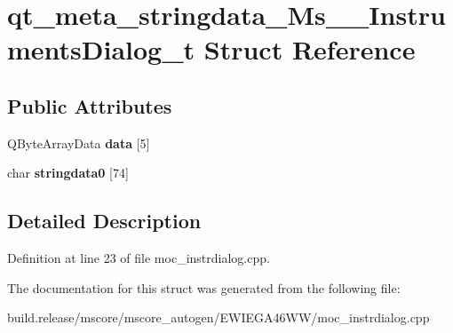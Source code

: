 \hypertarget{structqt__meta__stringdata___ms_____instruments_dialog__t}{}\section{qt\+\_\+meta\+\_\+stringdata\+\_\+\+Ms\+\_\+\+\_\+\+Instruments\+Dialog\+\_\+t Struct Reference}
\label{structqt__meta__stringdata___ms_____instruments_dialog__t}
\subsection*{Public Attributes}
\begin{DoxyCompactItemize}
\item 
\mbox{\label{structqt__meta__stringdata___ms_____instruments_dialog__t_a536ed3f3a4277171deba9ec669fe6dc2}} 
Q\+Byte\+Array\+Data {\bfseries data} \mbox{[}5\mbox{]}
\item 
\mbox{\label{structqt__meta__stringdata___ms_____instruments_dialog__t_a830f3d84a2d0cdd1a234f2975defc28b}} 
char {\bfseries stringdata0} \mbox{[}74\mbox{]}
\end{DoxyCompactItemize}


\subsection{Detailed Description}


Definition at line 23 of file moc\+\_\+instrdialog.\+cpp.



The documentation for this struct was generated from the following file\+:\begin{DoxyCompactItemize}
\item 
build.\+release/mscore/mscore\+\_\+autogen/\+E\+W\+I\+E\+G\+A46\+W\+W/moc\+\_\+instrdialog.\+cpp\end{DoxyCompactItemize}
